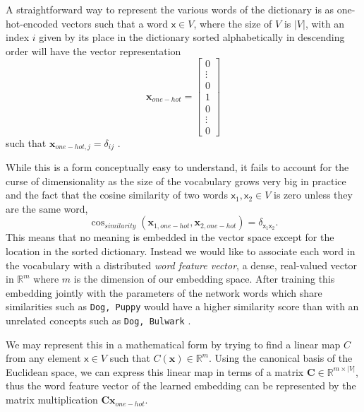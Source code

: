 A straightforward way to represent the various words of the dictionary is as
one-hot-encoded vectors such that a word $\mathsf{x} \in V$, where the size of
$V$ is $|V|$, with an index $i$ given by its place in the dictionary sorted
alphabetically in descending order will have the vector representation
\begin{equation}
  \label{eq:one_hot_encoding}
  \bm{x}_{one-hot} =
  \begin{bmatrix}
    0 \\
    \vdots \\
    0 \\
    1 \\
    0 \\
    \vdots \\
    0
  \end{bmatrix}
\end{equation}
such that $\bm{x}_{one-hot, j} = \delta_{ij}$ \cite[p.~6]{goldberg2015primer}.

While this is a form conceptually easy to understand, it fails to account for the
curse of dimensionality as the size of the vocabulary grows very big in practice
and the fact that the cosine similarity of two words $\mathsf{x}_1,
\mathsf{x}_2 \in V$ is zero unless they are the same word,
\begin{equation}
  \label{eq:cosine_similarity}
  \cos_{similarity}(\bm{x}_{1, one-hot}, \bm{x}_{2, one-hot}) = \delta_{\mathsf{x}_1 \mathsf{x}_2}.
\end{equation} This means that no meaning is embedded in the vector space
except for the location in the sorted dictionary. Instead we would like to
associate each word in the vocabulary with a distributed \textit{word feature
  vector}, a dense, real-valued vector in $\mathbb{R}^m$ where $m$ is the
dimension of our embedding space. After training this embedding jointly with the
parameters of the network words which share similarities such as \texttt{Dog,
  Puppy} would have a higher similarity score than with an unrelated concepts such as
\texttt{Dog, Bulwark} \cite{Bengio:2003:NPL:944919.944966}.

We may represent this in a mathematical form by trying to find a linear map $C$
from any element $\mathsf{x} \in V$ such that $C(\mathbf{x}) \in \mathbb{R}^m$.
Using the canonical basis of the Euclidean space, we can express this
linear map in terms of a matrix $\bm{C} \in \mathbb{R}^{m \times |V|}$, thus the
word feature vector of the learned embedding can be represented by the matrix
multiplication $\bm{C}\bm{x}_{one-hot}$.

